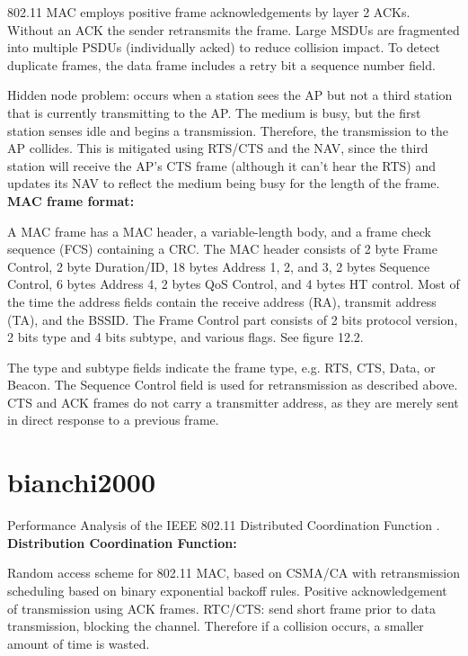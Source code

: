 802.11 MAC employs positive frame acknowledgements by layer 2 ACKs. Without an ACK the sender retransmits the frame. Large MSDUs are fragmented into multiple PSDUs (individually acked) to reduce collision impact. To detect duplicate frames, the data frame includes a retry bit a sequence number field.

Hidden node problem: occurs when a station sees the AP but not a third station that is currently transmitting to the AP. The medium is busy, but the first station senses idle and begins a transmission. Therefore, the transmission to the AP collides. This is mitigated using RTS/CTS and the NAV, since the third station will receive the AP's CTS frame (although it can't hear the RTS) and updates its NAV to reflect the medium being busy for the length of the frame.\\

\textbf{MAC frame format:}

A MAC frame has a MAC header, a variable-length body, and a frame check sequence (FCS) containing a CRC. The MAC header consists of 2 byte Frame Control, 2 byte Duration/ID, 18 bytes Address 1, 2, and 3, 2 bytes Sequence Control, 6 bytes Address 4, 2 bytes QoS Control, and 4 bytes HT control. Most of the time the address fields contain the receive address (RA), transmit address (TA), and the BSSID. The Frame Control part consists of 2 bits protocol version, 2 bits type and 4 bits subtype, and various flags. See \cite{perahia2013} figure 12.2.

The type and subtype fields indicate the frame type, e.g. RTS, CTS, Data, or Beacon. The Sequence Control field is used for retransmission as described above. CTS and ACK frames do not carry a transmitter address, as they are merely sent in direct response to a previous frame.



\section*{bianchi2000}

Performance Analysis of the IEEE 802.11 Distributed Coordination Function \cite{bianchi2000}.\\

\textbf{Distribution Coordination Function:}

Random access scheme for 802.11 MAC, based on CSMA/CA with retransmission scheduling based on binary exponential backoff rules. Positive acknowledgement of transmission using ACK frames. RTC/CTS: send short frame prior to data transmission, blocking the channel. Therefore if a collision occurs, a smaller amount of time is wasted.

